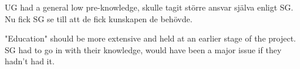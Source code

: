 \documentclass[a4paper]{article}
\begin{document}
UG had a general low pre-knowledge, skulle tagit större ansvar själva enligt SG. Nu fick SG se till att de fick kunskapen de behövde. 

"Education" should be more extensive and held at an earlier stage of the project. SG had to go in with their knowledge, would have been a major issue if they hadn't had it.

%
%
%
%
%
%
%
%
%
%
\end{document}
